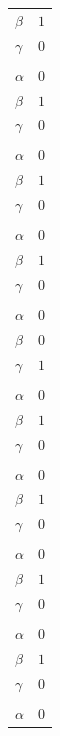 \documentclass[11pt]{article}
\begin{document}
\begin{longtable}{@{}ll@{}}
$\beta$ & $1$\\
$\gamma$ & $0$\\
\addlinespace[3pt]
\multicolumn{2}{@{}l}{$\{i,j\}=\{187,200\}$, $k_{ij}=3\cdot 7$}\\
$\alpha$ & $0$\\
$\beta$ & $1$\\
$\gamma$ & $0$\\
\addlinespace[3pt]
\multicolumn{2}{@{}l}{$\{i,j\}=\{187,212\}$, $k_{ij}=3\cdot 7$}\\
$\alpha$ & $0$\\
$\beta$ & $1$\\
$\gamma$ & $0$\\
\addlinespace[3pt]
\multicolumn{2}{@{}l}{$\{i,j\}=\{187,220\}$, $k_{ij}=3\cdot 7$}\\
$\alpha$ & $0$\\
$\beta$ & $1$\\
$\gamma$ & $0$\\
\addlinespace[3pt]
\multicolumn{2}{@{}l}{$\{i,j\}=\{190,191\}$, $k_{ij}=7$}\\
$\alpha$ & $0$\\
$\beta$ & $0$\\
$\gamma$ & $1$\\
\addlinespace[3pt]
\multicolumn{2}{@{}l}{$\{i,j\}=\{191,192\}$, $k_{ij}=7$}\\
$\alpha$ & $0$\\
$\beta$ & $1$\\
$\gamma$ & $0$\\
\addlinespace[3pt]
\multicolumn{2}{@{}l}{$\{i,j\}=\{191,199\}$, $k_{ij}=7$}\\
$\alpha$ & $0$\\
$\beta$ & $1$\\
$\gamma$ & $0$\\
\addlinespace[3pt]
\multicolumn{2}{@{}l}{$\{i,j\}=\{191,223\}$, $k_{ij}=7$}\\
$\alpha$ & $0$\\
$\beta$ & $1$\\
$\gamma$ & $0$\\
\addlinespace[3pt]
\multicolumn{2}{@{}l}{$\{i,j\}=\{191,225\}$, $k_{ij}=7$}\\
$\alpha$ & $0$\\
$\beta$ & $1$\\
$\gamma$ & $0$\\
\addlinespace[3pt]
\multicolumn{2}{@{}l}{$\{i,j\}=\{193,194\}$, $k_{ij}=2^{2}\cdot 3\cdot 5^{2}$}\\
$\alpha$ & $0$\\

\end{longtable}
\end{document}
